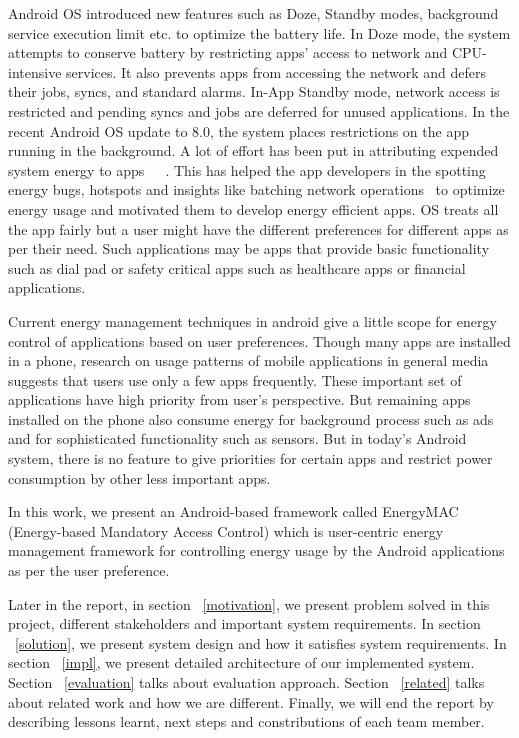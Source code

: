  
Android OS introduced new features such as Doze, Standby modes, background service execution limit etc. to optimize the battery life. In Doze mode, the system attempts to conserve battery by restricting apps' access to network and CPU-intensive services. It also prevents apps from accessing the network and defers their jobs, syncs, and standard alarms. In-App Standby mode, network access is restricted and pending syncs and jobs are deferred for unused applications. In the recent Android OS update to 8.0, the system places restrictions on the app running in the background. A lot of effort has been put in attributing expended system energy to apps~\cite{pathak2012energy}~\cite{yoon2012appscope}~\cite{zhang2010accurate}. This has helped the app developers in the spotting energy bugs, hotspots\cite{banerjee2014detecting} and insights like batching network operations~\cite{pathak2012energy} to optimize energy usage and motivated them to develop energy efficient apps. OS treats all the app fairly but a user might have the different preferences for different apps as per their need. Such applications may be apps that provide basic functionality such as dial pad or safety critical apps such as healthcare apps or financial applications.
 
Current energy management techniques in android give a little scope for energy control of applications based on user preferences. Though many apps are installed in a phone, research on usage patterns of mobile applications in general media~\cite{techcrunch85}~\cite{techcrunch63} suggests that users use only a few apps frequently. These important set of applications have high priority from user's perspective. But remaining apps installed on the phone also consume energy for background process such as ads~\cite{stevens2012investigating} and for sophisticated functionality such as sensors.  But in today's Android system, there is no feature to give priorities for certain apps and restrict power consumption by other less important apps. 

In this work, we present an Android-based framework called EnergyMAC (Energy-based Mandatory Access Control) which is user-centric energy management framework for controlling energy usage by the Android applications as per the user preference.  

Later in the report, in section ~\ref{motivation}, we present problem solved in this project, different stakeholders and important system requirements. In section ~\ref{solution}, we present system design and how it satisfies system requirements. In section ~\ref{impl}, we present detailed architecture of our implemented system.  Section ~\ref{evaluation} talks about evaluation approach. Section ~\ref{related} talks about related work and how we are different. Finally, we will end the report by describing lessons learnt, next steps and constributions of each team member.


